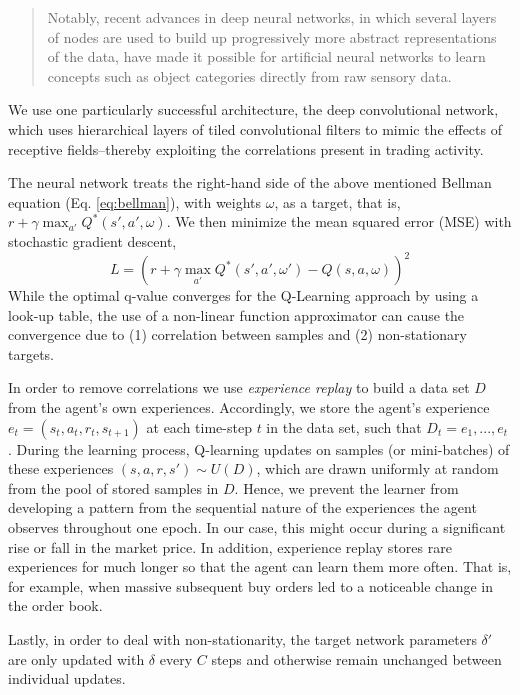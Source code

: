 \begin{quote}
Notably, recent advances in deep neural networks, in which several layers of nodes are used to build up progressively more abstract representations of the data, have made it possible for artificial neural networks to learn concepts such as object categories directly from raw sensory data.\cite{mnih2015human}
\end{quote}
We use one particularly successful architecture, the deep convolutional network\cite{cnn}, which uses hierarchical layers of tiled convolutional filters to mimic the effects of receptive fields--thereby exploiting the correlations present in trading activity.


The neural network treats the right-hand side of the above mentioned Bellman equation (Eq. \ref{eq:bellman}), with weights $\omega$, as a target, that is, $r+\gamma \max_{a'} Q^*(s',a', \omega)$.
We then minimize the mean squared error (MSE) with stochastic gradient descent,
\begin{equation}
    L=(r+\gamma \max_{a'} Q^*(s',a', \omega') - Q(s,a,\omega))^2
\end{equation}
While the optimal q-value converges for the Q-Learning approach by using a look-up table, the use of a non-linear function approximator can cause the convergence due to (1) correlation between samples and (2) non-stationary targets.

In order to remove correlations we use \textit{experience replay} to build a data set $D$ from the agent's own experiences.
Accordingly, we store the agent's experience $e_t=(s_t, a_t, r_t, s_{t+1})$ at each time-step $t$ in the data set, such that $D_t = {e_1, ..., e_t}$.
During the learning process, Q-learning updates on samples (or mini-batches) of these experiences $(s,a,r,s') \sim U(D)$, which are drawn uniformly at random from the pool of stored samples in $D$.
Hence, we prevent the learner from developing a pattern from the sequential nature of the experiences the agent observes throughout one epoch.
In our case, this might occur during a significant rise or fall in the market price.
In addition, experience replay stores rare experiences for much longer so that the agent can learn them more often.
That is, for example, when massive subsequent buy orders led to a noticeable change in the order book.

Lastly, in order to deal with non-stationarity, the target network parameters $\delta'$ are only updated with $\delta$ every $C$ steps and otherwise remain unchanged between individual updates.
